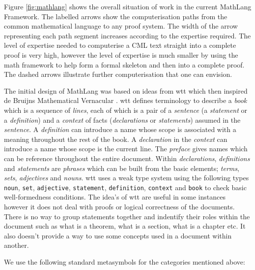 Figure \ref{fig:mathlang} shows the overall situation of work in the current MathLang Framework.
The labelled arrows show the computerisation paths from the common mathematical language to any proof system. 
The width of the arrow representing each path segment increases according to the expertise required. The level of expertise needed to computerise a CML text straight into a complete proof is very high, however the level of expertise is much smaller by using the \gls{math} framework to help form a formal skeleton and then into a complete proof. The dashed arrows illustrate further computerisation that one can envision.

The initial design of MathLang was based on ideas from \gls{wtt} \cite{wtt} which then inspired de Bruijns Mathematical Vernacular \cite{mv}.
\Gls{wtt} defines terminology to describe a \emph{book} which is a sequence of \emph{lines}, each of which is a pair of a \emph{sentence} (a \emph{statement} or a \emph{definition}) and a \emph{context} of
facts (\emph{declarations} or \emph{statements}) assumed in the \emph{sentence}. A \emph{definition} can introduce a name whose scope is associated with a meaning throughout the rest of the book. A \emph{declaration} in the \emph{context} can introduce a name whose scope is the current line.
The \emph{preface} gives names which can be reference throughout the entire document. Within \emph{declarations}, \emph{definitions} and \emph{statements} are \emph{phrases} which can be built from the basic elements; \emph{terms}, \emph{sets}, \emph{adjectives} and \emph{nouns}.
\Gls{wtt} uses a weak type system using the following types \texttt{noun}, \texttt{set}, \texttt{adjective}, \texttt{statement}, \texttt{definition}, \texttt{context} and \texttt{book} to check basic well-formedness conditions.
The idea's of \gls{wtt} are useful in some instances however it does not deal with proofs or logical correctness of the documents. There is no way to group statements together and indentify their roles within the document such as what is a theorem, what is a section, what is a chapter etc. It also doesn't provide a way to use some concepts used in a document within another.

We use the following standard metasymbols for the categories mentioned above:

